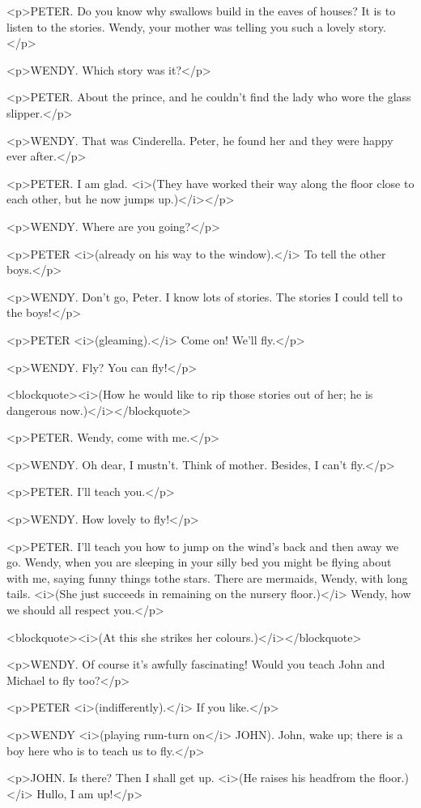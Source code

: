 <p>PETER. Do you know why swallows build in the eaves of houses? It is to listen to the stories. Wendy, your mother was telling you such a lovely story.</p>

<p>WENDY. Which story was it?</p>

<p>PETER. About the prince, and he couldn't find the lady who wore the glass slipper.</p>

<p>WENDY. That was Cinderella. Peter, he found her and they were happy ever after.</p>

<p>PETER. I am glad. <i>(They have worked their way along the floor close to each other, but he now jumps up.)</i></p>

<p>WENDY. Where are you going?</p>

<p>PETER <i>(already on his way to the window).</i> To tell the other boys.</p>

<p>WENDY. Don't go, Peter. I know lots of stories. The stories I could tell to the boys!</p>

<p>PETER <i>(gleaming).</i> Come on! We'll fly.</p>

<p>WENDY. Fly? You can fly!</p>

<blockquote><i>(How he would like to rip those stories out of her; he is dangerous now.)</i></blockquote>

<p>PETER. Wendy, come with me.</p>

<p>WENDY. Oh dear, I mustn't. Think of mother. Besides, I can't fly.</p>

<p>PETER. I'll teach you.</p>

<p>WENDY. How lovely to fly!</p>

<p>PETER. I'll teach you how to jump on the wind's back and then away we go. Wendy, when you are sleeping in your silly bed you might be flying about with me, saying funny things tothe stars. There are mermaids, Wendy, with long tails. <i>(She just succeeds in remaining on the nursery floor.)</i> Wendy, how we should all respect you.</p>

<blockquote><i>(At this she strikes her colours.)</i></blockquote>

<p>WENDY. Of course it's awfully fascinating! Would you teach John and Michael to fly too?</p>

<p>PETER <i>(indifferently).</i> If you like.</p>

<p>WENDY <i>(playing rum-turn on</i> JOHN). John, wake up; there is a boy here who is to teach us to fly.</p>

<p>JOHN. Is there? Then I shall get up. <i>(He raises his headfrom the floor.)</i> Hullo, I am up!</p>

